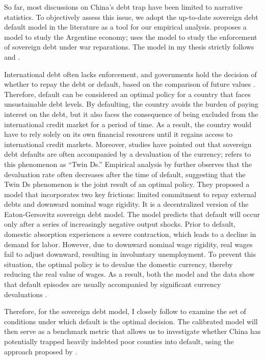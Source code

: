 So far, most discussions on China's debt trap have been limited to narrative statistics.
To objectively assess this issue, we adopt the up-to-date sovereign debt default model in the literature as a tool for our empirical analysis. \citet{Na-18} proposes a model to study the Argentine economy; \citet*{Hinrichsen_2020-chapter4} uses the model to study the enforcement of sovereign debt under war reparations.
The model in my thesis strictly follows \citet{Na-18} and \citet*{Hinrichsen_2020-chapter4}.

International debt often lacks enforcement, and governments hold the decision of whether to repay the debt or default, based on the comparison of future values \citep*{Eaton-Gersovitz-81}. Therefore, default can be considered an optimal policy for a country that faces unsustainable debt levels. By defaulting, the country avoids the burden of paying interest on the debt, but it also faces the consequence of being excluded from the international credit market for a period of time. As a result, the country would have to rely solely on its own financial resources until it regains access to international credit markets.
Moreover, studies have pointed out that sovereign debt defaults are often accompanied by a devaluation of the currency; \citet*{Reinhart02} refers to this phenomenon as ``Twin Ds.''
Empirical analysis by \citet{Na-18} further observes that the devaluation rate often decreases after the time of default, suggesting that the Twin Ds phenomenon is the joint result of an optimal policy.
They proposed a model that incorporates two key frictions: limited commitment to repay external debts and downward nominal wage rigidity.
It is a decentralized version of the Eaton-Gersovitz sovereign debt model.
The model predicts that default will occur only after a series of increasingly negative output shocks. Prior to default, domestic absorption experiences a severe contraction, which leads to a decline in demand for labor. However, due to downward nominal wage rigidity, real wages fail to adjust downward, resulting in involuntary unemployment. To prevent this situation, the optimal policy is to devalue the domestic currency, thereby reducing the real value of wages. As a result, both the model and the data show that default episodes are usually accompanied by significant currency devaluations \citep*{Na-18}.

Therefore, for the sovereign debt model, I closely follow \citet{Na-18} to examine the set of conditions under which default is the optimal decision.
The calibrated model will then serve as a benchmark metric that allows us to investigate whether China has potentially trapped heavily indebted poor counties into default, using the approach proposed by \citet*{Hinrichsen_2020-chapter4}.

